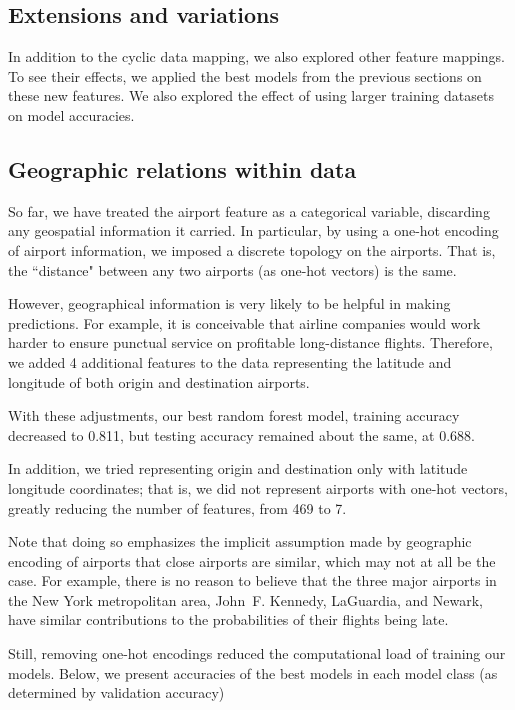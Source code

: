 \documentclass{article}
\begin{document}
\begin{multicols}{2}
\section{Extensions and variations}
\label{sec:dataset}

In addition to the cyclic data mapping,
we also explored other feature mappings.
To see their effects,
we applied the best models from the previous sections
on these new features.
We also explored the effect of using larger training datasets
on model accuracies.

\subsection{Geographic relations within data}

So far, we have treated the airport feature as a categorical variable,
discarding any geospatial information it carried.
In particular,
by using a one-hot encoding of airport information,
we imposed a discrete topology on the airports.
That is, the ``distance" between any two airports
(as one-hot vectors) is the same.

However, geographical information
is very likely to be helpful in making predictions.
For example, it is conceivable that airline companies
would work harder to ensure punctual service
on profitable long-distance flights.
Therefore, we added 4 additional features to the data
representing the latitude and longitude
of both origin and destination airports.

With these adjustments,
our best random forest model,
training accuracy decreased to 0.811,
but testing accuracy remained about the same,
at 0.688.

In addition, we tried representing origin and destination
only with latitude longitude coordinates;
that is, we did not represent airports with one-hot vectors,
greatly reducing the number of features, from 469 to 7.

Note that doing so emphasizes the implicit assumption
made by geographic encoding of airports
that close airports are similar,
which may not at all be the case.
For example, there is no reason to believe
that the three major airports
in the New York metropolitan area,
John~F. Kennedy, LaGuardia, and Newark,
have similar contributions to the probabilities of their flights being late.

Still,
removing one-hot encodings
reduced the computational load of training our models.
Below, we present accuracies of the best models in each model class
(as determined by validation accuracy)


\end{multicols}
\end{document}
